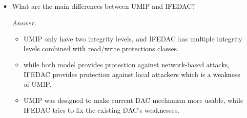 \documentclass[11pt]{article}
\begin{document}
\begin{description}
{\begin{itemize}
\begin{mdframed}
\begin{itemize}
		\item In UMIP a file essentially has two integrity level values: whether it is protected and whether it is contaminated
		\item UMIP’s integrity protection is compartmentalized by users. Even if one user has an exception policy that allows all low-integrity processes to access certain files owned by the user, another user’s low-integrity process is forbidden from such access. 
		\item UMIP allows low-integrity files to be upgraded
			to high-integrity. (This feature also exists in LOMAC.) This
			means that low-integrity information (such as files downloaded from the Internet) can flow into high-integrity objects (such as system binaries); however, such upgrade must
			occur explicitly, i.e., by invoking a special program in a
			high-integrity channel to remove the sticky bit. Allowing
			such channels is necessary for patching and system ungrade
		\item UMIP offers confidentiality protection. In particular, low integrity process doesn't allow to read files owned by system account. Biba only offer integrity protection.
		\item UMIP uses DAC information to determine integrity and confidentiality labels for objects, whereas in LO-
MAC each installation requires manual specification of a
mapping between existing files and integrity levels.
	\end{itemize}
\end{mdframed}
 \item
What are the main differences between UMIP and IFEDAC? \\
\begin{mdframed}
	\textit{Answer. } 
	\begin{itemize}
		\item UMIP only have two integrity levels, and IFEDAC has multiple integrity levels combined with read/write protections classes.
  
		\item while both model provides protection against network-based attacks, IFEDAC provides protection against local attackers which is a weakness of UMIP. 


		\item UMIP was designed to make current DAC mechanism more usable, while IFEDAC tries to fix the existing DAC's weaknesses.
	\end{itemize}
\end{mdframed}
\end{itemize}
}


\end{description}
\end{document}
